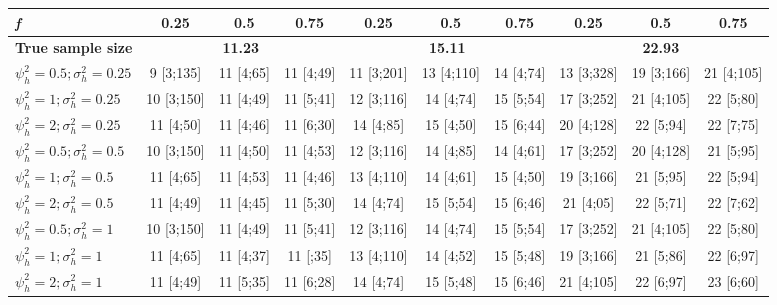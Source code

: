 \documentclass[AMA,STIX1COL,]{WileyNJD-v2}
\begin{document}
\begin{table}[ht]
{\begin{tabular}{l c c c c c c c c c}
\addlinespace[1pt]
\cmidrule(lr){2-4} \cmidrule(lr){5-7} \cmidrule(lr){8-10}
\textbf{\textit{f}} & \textbf{0.25} & \textbf{0.5} & \textbf{0.75} & \textbf{0.25} & \textbf{0.5} & \textbf{0.75} & \textbf{0.25} & \textbf{0.5} & \textbf{0.75} \\
\hline
\textbf{True sample size} & \multicolumn{3}{c}{\textbf{11.23}} & \multicolumn{3}{c}{\textbf{15.11}} & \multicolumn{3}{c}{\textbf{22.93}} \\
$\psi_h^2 = 0.5; \sigma_h^2 = 0.25$ & 9 [3;135] & 11 [4;65] & 11 [4;49] & 11 [3;201] & 13 [4;110] & 14 [4;74] & 13 [3;328] & 19 [3;166] & 21 [4;105] \\
$\psi_h^2 = 1; \sigma_h^2 = 0.25$ & 10 [3;150] & 11 [4;49] & 11 [5;41] & 12 [3;116] & 14 [4;74] & 15 [5;54] & 17 [3;252] & 21 [4;105] & 22 [5;80] \\
$\psi_h^2 = 2; \sigma_h^2 = 0.25$ & 11 [4;50] & 11 [4;46] & 11 [6;30] & 14 [4;85] & 15 [4;50] & 15 [6;44] & 20 [4;128] & 22 [5;94] & 22 [7;75] \\
$\psi_h^2 = 0.5; \sigma_h^2 = 0.5$ & 10 [3;150] & 11 [4;50] & 11 [4;53] & 12 [3;116] & 14 [4;85] & 14 [4;61] & 17 [3;252] & 20 [4;128] & 21 [5;95] \\
$\psi_h^2 = 1; \sigma_h^2 = 0.5$ & 11 [4;65] & 11 [4;53] & 11 [4;46] & 13 [4;110] & 14 [4;61] & 15 [4;50] & 19 [3;166] & 21 [5;95] & 22 [5;94] \\
$\psi_h^2 = 2; \sigma_h^2 = 0.5$ & 11 [4;49] & 11 [4;45] & 11 [5;30] & 14 [4;74] & 15 [5;54] & 15 [6;46] & 21 [4;05] & 22 [5;71] & 22 [7;62] \\
$\psi_h^2 = 0.5; \sigma_h^2 = 1$ & 10 [3;150] & 11 [4;49] & 11 [5;41] & 12 [3;116] & 14 [4;74] & 15 [5;54] & 17 [3;252] & 21 [4;105] & 22 [5;80] \\
$\psi_h^2 = 1; \sigma_h^2 = 1$ & 11 [4;65] & 11 [4;37] & 11 [;35] & 13 [4;110] & 14 [4;52] & 15 [5;48] & 19 [3;166] & 21 [5;86] & 22 [6;97] \\
$\psi_h^2 = 2; \sigma_h^2 = 1$ & 11 [4;49] & 11 [5;35] & 11 [6;28] & 14 [4;74] & 15 [5;48] & 15 [6;46] & 21 [4;105] & 22 [6;97] & 23 [6;60] \\
\bottomrule
\end{tabular}}
\end{table}
\end{document}
